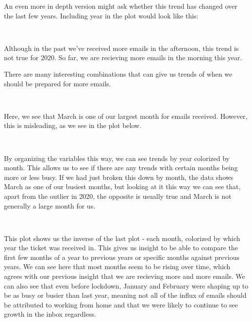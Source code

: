 \documentclass[11pt]{article}
\begin{document}
    An even more in depth version might ask whether this trend has changed
over the last few years. Including year in the plot would look like
this:

    \begin{center}
    \end{center}
    { \hspace*{\fill} \\}
    
    Although in the past we've received more emails in the afternoon, this
trend is not true for 2020. So far, we are recieving more emails in the
morning this year.

There are many interesting combinations that can give us trends of when
we should be prepared for more emails.

    \begin{center}
    \end{center}
    { \hspace*{\fill} \\}
    
    Here, we see that March is one of our largest month for emails received.
However, this is misleading, as we see in the plot below.

    \begin{center}
    \end{center}
    { \hspace*{\fill} \\}
    
    By organizing the variables this way, we can see trends by year
colorized by month. This allows us to see if there are any trends with
certain months being more or less busy. If we had just broken this down
by month, the data shows March as one of our busiest months, but looking
at it this way we can see that, apart from the outlier in 2020, the
opposite is usually true and March is not generally a large month for
us.

    \begin{center}
    \end{center}
    { \hspace*{\fill} \\}
    
    This plot shows us the inverse of the last plot - each month, colorized
by which year the ticket was received in. This gives us insight to be
able to compare the first few months of a year to previous years or
specific months against previous years. We can see here that most months
seem to be rising over time, which agrees with our previous insight that
we are recieving more and more emails. We can also see that even before
lockdown, January and February were shaping up to be as busy or busier
than last year, meaning not all of the influx of emails should be
attributed to working from home and that we were likely to continue to
see growth in the inbox regardless.
\end{document}
